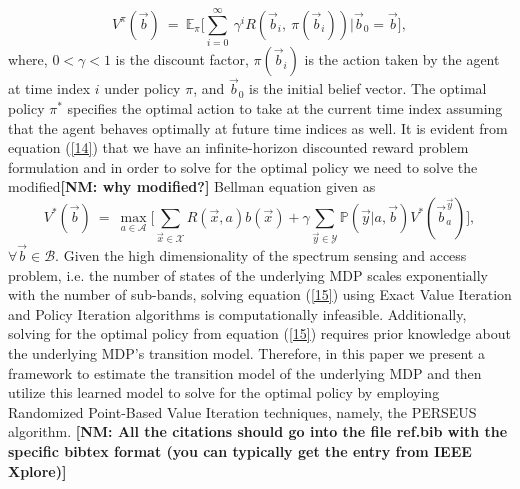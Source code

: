 \documentclass[10pt,twocolumn]{IEEEtran}
\newcommand{\nm}[1]{{\color{blue}\bf{[NM: #1]}}}
\begin{document}
\begin{equation}\label{14}
    V^{\pi}(\vec{b})\ =\ \mathbb{E}_{\pi}\Big[\sum_{i=0}^{\infty}\ \gamma^i R(\vec{b}_i,\ \pi(\vec{b}_i))|\vec{b}_0=\vec{b}\Big],
\end{equation}
where, $0 < \gamma < 1$ is the discount factor, $\pi(\vec{b}_i)$ is the action taken by the agent at time index $i$ under policy $\pi$, and $\vec{b}_0$ is the initial belief vector. The optimal policy $\pi^*$ specifies the optimal action to take at the current time index assuming that the agent behaves optimally at future time indices as well. It is evident from equation (\ref{14}) that we have an infinite-horizon discounted reward problem formulation and in order to solve for the optimal policy we need to solve the modified\nm{why modified?} Bellman equation given as
\begin{equation}\label{15}
    V^*(\vec{b})\ =\ \max_{a \in \mathcal{A}}\Big[\sum_{\vec{x} \in \mathcal{X}}R(\vec{x},a)b(\vec{x}) + \gamma \sum_{\vec{y} \in \mathcal{Y}}\mathbb{P}(\vec{y}|a,\vec{b})V^*(\vec{b}_a^{\vec{y}})\Big],
\end{equation}
$\forall \vec{b} \in \mathcal{B}$. Given the high dimensionality of the spectrum sensing and access problem, i.e. the number of states of the underlying MDP scales exponentially with the number of sub-bands, solving equation (\ref{15}) using Exact Value Iteration and Policy Iteration algorithms is computationally infeasible. Additionally, solving for the optimal policy from equation (\ref{15}) requires prior knowledge about the underlying MDP's transition model. Therefore, in this paper we present a framework to estimate the transition model of the underlying MDP and then utilize this learned model to solve for the optimal policy by employing Randomized Point-Based Value Iteration techniques, namely, the PERSEUS algorithm.
\nm{All the citations should go into the file ref.bib with the specific bibtex format (you can typically get the entry from IEEE Xplore)}

 
\end{document}
